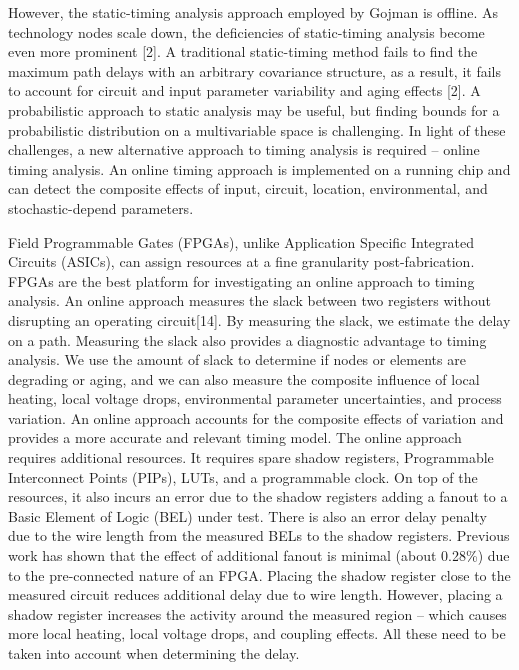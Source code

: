 \documentclass[11pt]{report}
\begin{document}
\begin{mainf}
However, the static-timing analysis approach employed by Gojman is offline. As technology nodes scale down, the deficiencies of static-timing analysis become even more prominent [2]. A traditional static-timing method fails to find the maximum path delays with an arbitrary covariance structure, as a result, it fails to account for circuit and input parameter variability and aging effects [2]. A probabilistic approach to static analysis may be useful, but finding bounds for a probabilistic distribution on a multivariable space is challenging. In light of these challenges, a new alternative approach to timing analysis is required -- online timing analysis. An online timing approach is implemented on a running chip and can detect the composite effects of input, circuit, location, environmental, and stochastic-depend parameters. 

Field Programmable Gates (FPGAs), unlike Application Specific Integrated Circuits (ASICs), can assign resources at a fine granularity post-fabrication. FPGAs are the best platform for investigating an online approach to timing analysis. An online approach measures the slack between two registers without disrupting an operating circuit[14]. By measuring the slack, we estimate the delay on a path. Measuring the slack also provides a diagnostic advantage to timing analysis. We use the amount of slack to determine if nodes or elements are degrading or aging, and we can also measure the composite influence of local heating, local voltage drops, environmental parameter uncertainties, and process variation. An online approach accounts for the composite effects of variation and provides a more accurate and relevant timing model. The online approach requires additional resources. It requires spare shadow registers, Programmable Interconnect Points (PIPs), LUTs, and a programmable clock. On top of the resources, it also incurs an error due to the shadow registers adding a fanout to a Basic Element of Logic (BEL) under test. There is also an error delay penalty due to the wire length from the measured BELs to the shadow registers. Previous work has shown that the effect of additional fanout is minimal (about 0.28\%) due to the pre-connected nature of an FPGA. Placing the shadow register close to the measured circuit reduces additional delay due to wire length. However, placing a shadow register increases the activity around the measured region -- which causes more local heating, local voltage drops, and coupling effects. All these need to be taken into account when determining the delay. 


\end{mainf}
\end{document}
